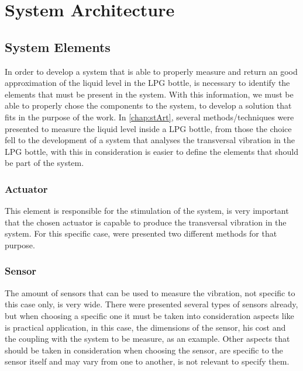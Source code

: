 \cleardoublepage
\chapter{System Architecture} \label{chap:sysArch}
\section{System Elements}
In order to develop a system that is able to properly measure and return an good approximation of the liquid level in the LPG bottle, is necessary to identify the elements that must be present in the system. With this information, we must be able to properly chose the components to the system, to develop a solution that fits in the purpose of the work. In \ref{chap:stArt}, several methods/techniques were presented to measure the liquid level inside a LPG bottle, from those the choice fell to the development of a system that analyses the transversal vibration in the LPG bottle, with this in consideration is easier to define the elements that should be part of the system. 
\subsection*{Actuator}
This element is  responsible for the stimulation of the system, is very important that the chosen actuator is capable to produce the transversal vibration in the system. For this specific case, were presented two different methods for that purpose.
\subsection*{Sensor}
The amount of sensors that can be used to measure the vibration, not specific to this case only, is very wide. There were presented several types of sensors already, but when choosing a specific one it must be taken into consideration aspects like is practical application, in this case, the dimensions of the sensor, his cost and the coupling with the system to be measure, as an example. Other aspects that should be taken in consideration when choosing the sensor, are specific to the sensor itself and may vary from one to another, is not relevant to specify them. 
